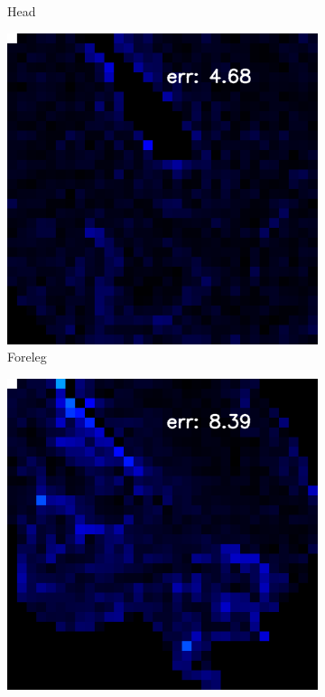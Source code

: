 \begin{figure}[H]
\begin{subfigure}[b]{0.18\linewidth}
		\caption{Head}
	\end{subfigure}
	\begin{subfigure}[b]{0.18\linewidth}
		\includegraphics[width=\linewidth]{./Figures/trip_net_zoom_in/eval_7_32_12_error.png}
		\caption{Foreleg}
	\end{subfigure}
	\begin{subfigure}[b]{0.18\linewidth}
		\includegraphics[width=\linewidth]{./Figures/trip_net_zoom_in/eval_7_42_-28_error.png}

\end{subfigure}
\end{figure}
